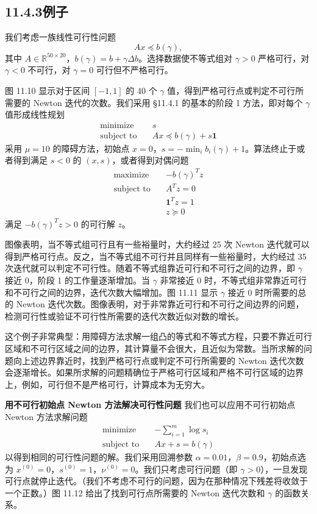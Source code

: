 \documentclass[UTF8,12pt,a4paper,fontset=fandol]{ctexart}
\begin{document}
\subsection*{11.4.3\quad 例子}

我们考虑一族线性可行性问题
\[
Ax\preceq b(\gamma),
\]
其中 $A\in\mathbb{R}^{50\times 20}$，$b(\gamma)=b+\gamma\Delta b$。选择数据使不等式组对 $\gamma>0$ 严格可行，对 $\gamma<0$ 不可行，对 $\gamma=0$ 可行但不严格可行。

图 11.10 显示对于区间 $[-1,1]$ 的 40 个 $\gamma$ 值，得到严格可行点或判定不可行所需要的 Newton 迭代的次数。我们采用 \S11.4.1 的基本的阶段 1 方法，即对每个 $\gamma$ 值形成线性规划
\[
\begin{aligned}
\text{minimize}\quad & s\\
\text{subject to}\quad & Ax\preceq b(\gamma)+s\mathbf{1}
\end{aligned}
\]
采用 $\mu=10$ 的障碍方法，初始点 $x=0$，$s=-\min_i b_i(\gamma)+1$。算法终止于或者得到满足 $s<0$ 的 $(x,s)$，或者得到对偶问题
\[
\begin{aligned}
\text{maximize}\quad & -b(\gamma)^Tz\\
\text{subject to}\quad & A^Tz=0\\
& \mathbf{1}^Tz=1\\
& z\succeq 0
\end{aligned}
\]
满足 $-b(\gamma)^Tz>0$ 的可行解 $z$。

图像表明，当不等式组可行且有一些裕量时，大约经过 25 次 Newton 迭代就可以得到严格可行点。反之，当不等式组不可行并且同样有一些裕量时，大约经过 35 次迭代就可以判定不可行性。随着不等式组靠近可行和不可行之间的边界，即 $\gamma$ 接近 0，阶段 1 的工作量逐渐增加。当 $\gamma$ 非常接近 0 时，不等式组非常靠近可行和不可行之间的边界，迭代次数大幅增加。图 11.11 显示 $\gamma$ 接近 0 时所需要的总的 Newton 迭代次数。图像表明，对于非常靠近可行和不可行之间边界的问题，检测可行性或验证不可行性所需要的迭代次数近似对数的增长。

这个例子非常典型：用障碍方法求解一组凸的等式和不等式方程，只要不靠近可行区域和不可行区域之间的边界，其计算量不会很大，且近似为常数。当所求解的问题向上述边界靠近时，找到严格可行点或判定不可行所需要的 Newton 迭代次数会逐渐增长。如果所求解的问题精确位于严格可行区域和严格不可行区域的边界上，例如，可行但不是严格可行，计算成本为无穷大。

\noindent\textbf{用不可行初始点 Newton 方法解决可行性问题}\quad
我们也可以应用不可行初始点 Newton 方法求解问题
\[
\begin{aligned}
\text{minimize}\quad & -\sum_{i=1}^m\log s_i\\
\text{subject to}\quad & Ax+s=b(\gamma)
\end{aligned}
\]
以得到相同的可行性问题的解。我们采用回溯参数 $\alpha=0.01$，$\beta=0.9$，初始点选为 $x^{(0)}=0$，$s^{(0)}=1$，$\nu^{(0)}=0$。我们只考虑可行问题（即 $\gamma>0$），一旦发现可行点就停止迭代。（我们不考虑不可行的问题，因为在那种情况下残差将收敛于一个正数。）图 11.12 给出了找到可行点所需要的 Newton 迭代次数和 $\gamma$ 的函数关系。
\end{document}

